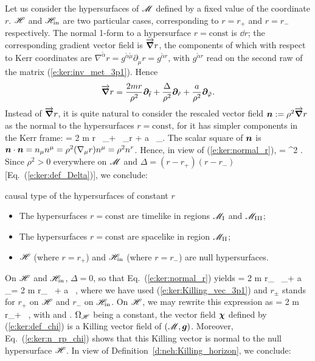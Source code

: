 Let us consider the hypersurfaces of $\mathscr{M}$ defined by a fixed value of
the coordinate $r$. $\mathscr{H}$ and $\mathscr{H}_{\rm in}$ are two particular cases,
corresponding to $r=r_+$ and $r=r_-$ respectively.
The normal 1-form to a hypersurface $r=\mathrm{const}$ is $\dd r$; the corresponding
gradient vector field is $\overrightarrow{\bm{\nabla}} r$, the components of which with respect
to Kerr coordinates are
$\nabla^{\tilde{\alpha}} r = g^{\tilde{\alpha}\tilde{\mu}} \partial_{\tilde{\mu}} r
= g^{\tilde{\alpha} r}$, with $g^{\tilde{\alpha} r}$ read on the second raw
of the matrix (\ref{e:ker:inv_met_3p1}). Hence
\[
    \overrightarrow{\bm{\nabla}} r = \frac{2m r}{\rho^2} \bm{\partial}_{\tilde t}
        +  \frac{\Delta}{\rho^2}\bm{\partial}_{\tilde r}
        +  \frac{a}{\rho^2} \bm{\partial}_{\tilde\varphi} .
\]
Instead of $ \overrightarrow{\bm{\nabla}} r$, it is quite natural to consider the rescaled vector field
$\bm{n} := \rho^2 \overrightarrow{\bm{\nabla}} r$
as the normal to the hypersurfaces $r=\mathrm{const}$, for it
has simpler components in the Kerr frame:
\be \label{e:ker:normal_r}
     = 2 m r \, \wpar_\ti + \Delta \, \wpar_{\tilde r} + a \, \wpar_\tph .
\ee
The scalar square of $\bm{n}$ is
$\bm{n}\cdot\bm{n} = n_\mu n^\mu = \rho^2 (\nabla_\mu r) n^\mu = \rho^2 n^r$.
Hence, in view of (\ref{e:ker:normal_r}),
\be
    \cdot{} = \rho^2 \Delta .
\ee
Since $\rho^2>0$ everywhere on $\mathscr{M}$ and $\Delta = (r-r_+)(r-r_-)$ [Eq.~(\ref{e:ker:def_Delta})], we conclude:
\begin{tprop}{causal type of the hypersurfaces of constant $r$}{}
\begin{itemize}
\item The hypersurfaces $r=\mathrm{const}$ are timelike in regions $\mathscr{M}_{\rm I}$ and $\mathscr{M}_{\rm III}$;
\item The hypersurfaces $r=\mathrm{const}$ are spacelike in region $\mathscr{M}_{\rm II}$;
\item $\mathscr{H}$ (where $r=r_+$) and $\mathscr{H}_{\rm in}$ (where $r=r_-$) are null hypersurfaces.
\end{itemize}
\end{tprop}

On $\mathscr{H}$ and $\mathscr{H}_{\rm in}$, $\Delta=0$, so that
Eq.~(\ref{e:ker:normal_r})
yields
\be \label{e:ker:normal_r_Killing}
     = 2 m r_{\pm} \, \wpar_\ti + a \, \wpar_\tph = 2 m r_{\pm} \, \w{\xi}
        + a \, \w{\eta} ,
\ee
where we have used (\ref{e:ker:Killing_vec_3p1}) and $r_{\pm}$ stands for
$r_+$ on $\mathscr{H}$ and $r_-$ on $\mathscr{H}_{\rm in}$.
On $\mathscr{H}$, we may rewrite this expression as
\be \label{e:ker:n_rp_chi}
     = 2 m r_+ \, \w{\chi} ,
\ee
with
\be \label{e:ker:def_chi}
    \encadre{\w{\chi} := \w{\xi} + \Omega_{\Hor} \, \w{\eta} }
\ee
and
\be \label{e:ker:def_OmegaH}
    .
\ee
$\Omega_{\mathscr{H}}$ being a constant, the vector field $\bm{\chi}$ defined by
(\ref{e:ker:def_chi}) is a Killing vector field of $(\mathscr{M},\bm{g})$.
Moreover, Eq.~(\ref{e:ker:n_rp_chi})
shows that this Killing vector is normal to the null hypersurface $\mathscr{H}$.
In view of Definition~\ref{d:neh:Killing_horizon}, we conclude:


